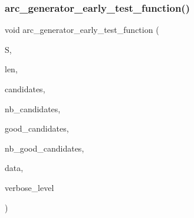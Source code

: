 \subsubsection{\texorpdfstring{arc\+\_\+generator\+\_\+early\+\_\+test\+\_\+function()}{arc\_generator\_early\_test\_function()}}
{\footnotesize\ttfamily void arc\+\_\+generator\+\_\+early\+\_\+test\+\_\+function (\begin{DoxyParamCaption}\item[{\mbox{\hyperlink{galois_8h_a09fddde158a3a20bd2dcadb609de11dc}{I\+NT}} $\ast$}]{S,  }\item[{\mbox{\hyperlink{galois_8h_a09fddde158a3a20bd2dcadb609de11dc}{I\+NT}}}]{len,  }\item[{\mbox{\hyperlink{galois_8h_a09fddde158a3a20bd2dcadb609de11dc}{I\+NT}} $\ast$}]{candidates,  }\item[{\mbox{\hyperlink{galois_8h_a09fddde158a3a20bd2dcadb609de11dc}{I\+NT}}}]{nb\+\_\+candidates,  }\item[{\mbox{\hyperlink{galois_8h_a09fddde158a3a20bd2dcadb609de11dc}{I\+NT}} $\ast$}]{good\+\_\+candidates,  }\item[{\mbox{\hyperlink{galois_8h_a09fddde158a3a20bd2dcadb609de11dc}{I\+NT}} \&}]{nb\+\_\+good\+\_\+candidates,  }\item[{void $\ast$}]{data,  }\item[{\mbox{\hyperlink{galois_8h_a09fddde158a3a20bd2dcadb609de11dc}{I\+NT}}}]{verbose\+\_\+level }\end{DoxyParamCaption})}

\mbox{\label{arc__generator_8_c_acda128790cd35f815fb986e87ac30e44}} 
